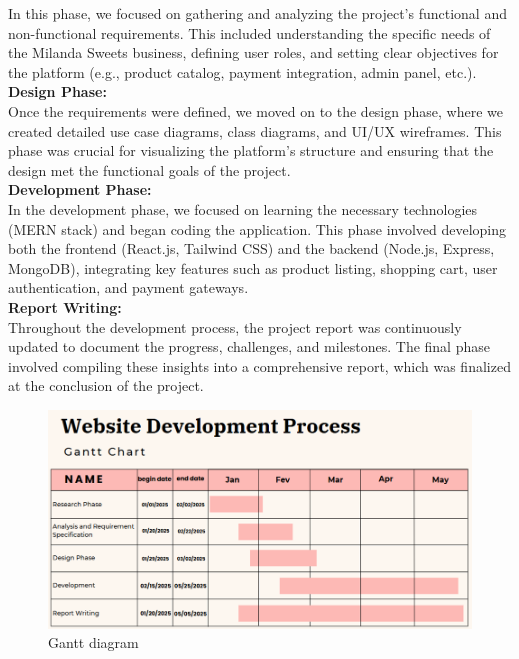 In this phase, we focused on gathering and analyzing the project’s functional and non-functional requirements. This included understanding the specific needs of the Milanda Sweets business, defining user roles, and setting clear objectives for the platform (e.g., product catalog, payment integration, admin panel, etc.).\\

\textbf{Design Phase:}\\

Once the requirements were defined, we moved on to the design phase, where we created detailed use case diagrams, class diagrams, and UI/UX wireframes. This phase was crucial for visualizing the platform’s structure and ensuring that the design met the functional goals of the project.\\

\textbf{Development Phase:}\\

In the development phase, we focused on learning the necessary technologies (MERN stack) and began coding the application. This phase involved developing both the frontend (React.js, Tailwind CSS) and the backend (Node.js, Express, MongoDB), integrating key features such as product listing, shopping cart, user authentication, and payment gateways.\\

\textbf{Report Writing:}\\

Throughout the development process, the project report was continuously updated to document the progress, challenges, and milestones. The final phase involved compiling these insights into a comprehensive report, which was finalized at the conclusion of the project.\\

\begin{figure}[!h]
\begin{center}
\includegraphics[width=15cm]{images/Gantt diagram.png}
\end{center}
\caption{Gantt diagram}
\end{figure}


